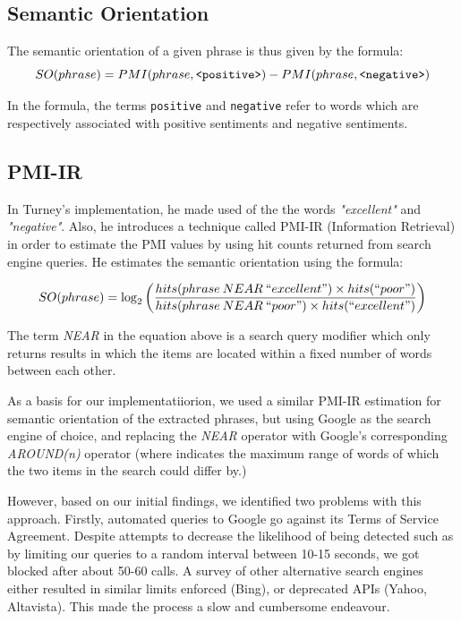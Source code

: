 \documentclass[11pt]{report} %
\begin{document}
\subsection{Semantic Orientation}
The semantic orientation of a given phrase is thus given by the formula:
\begin{equation*} SO(phrase) = PMI(phrase, \verb|<positive>|) - PMI(phrase, \verb|<negative>|)\end{equation*}

In the formula, the terms \verb|positive| and \verb|negative| refer to words which are respectively associated with positive sentiments and negative sentiments. 

\subsection{PMI-IR}
In Turney's implementation, he made used of the the words \textit{"excellent"} and \textit{"negative"}. Also, he introduces a technique called PMI-IR (Information Retrieval) in order to estimate the PMI values by using hit counts returned from search engine queries. He estimates the semantic orientation using the formula:

\begin{equation*} SO(phrase) = \log_2 \left(\frac{hits(phrase \: NEAR \: ``excellent") \times hits(``poor") }{hits(phrase \: NEAR \: ``poor") \times hits(``excellent") }\right) \end{equation*}

The term \textit{NEAR} in the equation above is a search query modifier which only returns results in which the items are located within a fixed number of words between each other. 

As a basis for our implementatiiorion, we used a similar PMI-IR estimation for semantic orientation of the extracted phrases, but using Google as the search engine of choice, and replacing the \textit{NEAR} operator with Google's corresponding \textit{AROUND(n)} operator (where  indicates the maximum range of words of which the two items in the search could differ by.)

However, based on our initial findings, we identified two problems with this approach. Firstly, automated queries to Google go against its Terms of Service Agreement. Despite attempts to decrease the likelihood of being detected such as by limiting our queries to a random interval between 10-15 seconds, we got blocked after about 50-60 calls. A survey of other alternative search engines either resulted in similar limits enforced (Bing), or deprecated APIs (Yahoo, Altavista). This made the process a slow and cumbersome endeavour.
\end{document}
